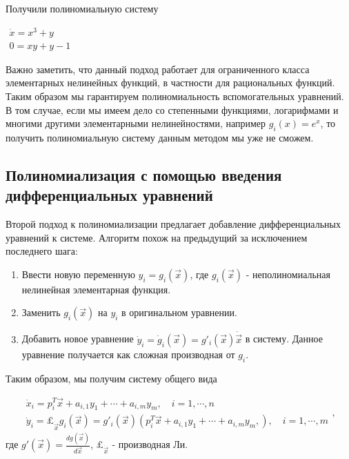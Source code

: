Получили полиномиальную систему

$\begin{array}{lcl}
    \dot x = x^3 + y \\
    0 = xy + y - 1
\end{array}$
\newline

\begin{remark}
Важно заметить, что данный подход работает для ограниченного класса элементарных нелинейных функций, в частности для рациональных функций. Таким образом мы гарантируем полиномиальность вспомогательных уравнений. В том случае, если мы имеем дело со степенными функциями, логарифмами и многими другими элементарными нелинейностями, например $g_i(x) = e^x$, то получить полиномиальную систему данным методом мы уже не сможем.
\end{remark}


\subsection{Полиномиализация с помощью введения дифференциальных уравнений} \label{sec:poly-diff}

Второй подход к полиномиализации предлагает добавление дифференциальных уравнений к системе.
Алгоритм похож на предыдущий за исключением последнего шага:

\begin{enumerate}
    \item Ввести новую переменную $y_i = g_i(\vec x)$, где $g_i(\vec x)$ - неполиномиальная нелинейная элементарная функция.
    \item Заменить $g_i(\vec x)$ на $y_i$ в оригинальном уравнении.
    \item Добавить новое уравнение $\dot y_i = \dot g_i(\vec x) = g'_i(\vec x) \dot {\vec x}$ в систему. Данное уравнение получается как сложная производная от $g_i$.
\end{enumerate}

Таким образом, мы получим систему общего вида

\begin{equation}
    \begin{array}{lcl}
        \dot x_i = p_i^T \vec x + a_{i,1} y_1 + \cdots + a_{i,m} y_m,\quad i = 1, \cdots, n \\
        \dot y_i = \pounds_{\dot{\vec x}} g_i(\vec x) = g'_i(\vec x)(p_i^T \vec x + a_{i,1} y_1 + \cdots + a_{i,m} y_m,),\quad i = 1, \cdots, m
    \end{array},
\end{equation}
\newline
где $g'(\vec x) = \frac {dg(\vec x)}{d \vec x}$, $\pounds_{\dot{\vec x}}$ - производная Ли.

